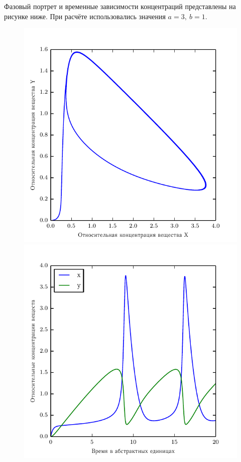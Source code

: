 Фазовый портрет и временные зависимости концентраций представлены на рисунке
ниже. При расчёте использовались значения \( a = 3,\ b = 1 \).

\begin{figure}[h]
\begin{center}
    \includegraphics[width = .47\textwidth]{05-brusselator/phase_portrait}
    \hfill
    \includegraphics[width = .47\textwidth]{05-brusselator/in_time}
\end{center}
\end{figure}

